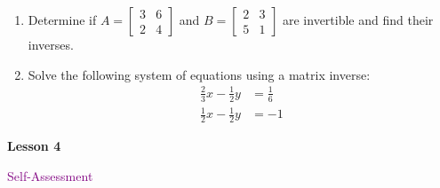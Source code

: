 \documentclass[10pt]{book}
\theoremstyle{definition}
\theoremstyle{remark}
\begin{document}
\begin{large}
\begin{enumerate}
\item  Determine if $A = \begin{bmatrix} 3&6\\2&4 \end{bmatrix}$ and $B = \begin{bmatrix}2&3\\5&1 \end{bmatrix}$ are invertible and find their inverses.\vfil \vfil

\item Solve the following system of equations using a matrix inverse: \begin{align*} \frac{2}{3}x - \frac{1}{2}y&=\frac{1}{6}\\\frac{1}{2}x-\frac{1}{2}y &=-1 \end{align*}\vfil\vfil
\end{enumerate}
\end{large}
\newpage


\begin{tcolorbox}[
  width=\textwidth,
  colback=gray!10, %
  colframe=white, %
  boxrule=0pt,    %
  left=1cm,       %
  right=1cm,      %
  sharp corners  %
]

\begin{minipage}[t]{0.5\textwidth}
  \Huge \textbf{Lesson 4}
\end{minipage}%
\hfill
\begin{minipage}[t]{0.5\textwidth}
  \Huge\textcolor{purple}{Self-Assessment}
\end{minipage}
\end{tcolorbox}
\end{document}
